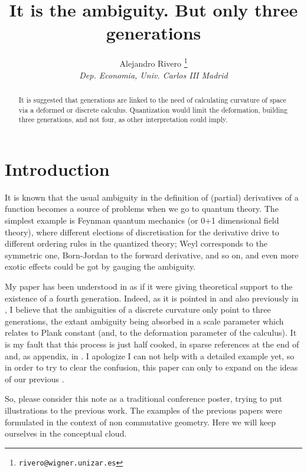 \documentclass[a4paper]{article}
\begin{document}
\title{It is the ambiguity. But only three generations}

\author{Alejandro Rivero \thanks {\tt rivero@wigner.unizar.es} \\
{\it Dep. Economia, Univ. Carlos III Madrid }}

\maketitle
\begin{abstract}
It is suggested that generations are linked to the need of calculating
curvature of space via a deformed or discrete calculus. Quantization would
limit the deformation, building three generations, and not four, as other
interpretation could imply. 
\end{abstract}

\section{Introduction}

It is known \cite{dowker,g} that the usual ambiguity 
in the definition of (partial) derivatives
of a function becomes a source of problems when we go to quantum theory.
The simplest example is Feynman quantum mechanics (or 0+1 dimensional
field theory), where different elections of discretisation for the
derivative drive to different ordering rules in the quantized theory; Weyl
corresponds to the symmetric one, Born-Jordan to the forward derivative, and
so on, and even more exotic effects could be got by gauging the ambiguity.

My paper \cite{generations} has been understood in \cite{four} as if it
were giving
theoretical support to the existence of a fourth generation. Indeed, as
it is pointed in \cite{generations} and also previously in \cite{conjectures},
I believe that the ambiguities of a discrete curvature only point to
three generations, the extant ambiguity being absorbed in a scale parameter
which relates to Plank constant (and, to the deformation parameter of the
calculus). It is my fault that this process is just half cooked, in 
sparse references at the end of \cite{fletter} and, as appendix, in
\cite{grupoid}. I apologize I can not help with a detailed example yet, so in
order to try to clear the confusion, this paper can only to expand on
the ideas of our previous \cite{generations}. 

So, please consider this note
as a traditional conference poster, trying to put illustrations
to the previous work. 
The examples of the previous papers were formulated in the context
of non commutative geometry. Here we will keep ourselves in the  
conceptual cloud. 
\end{document}
